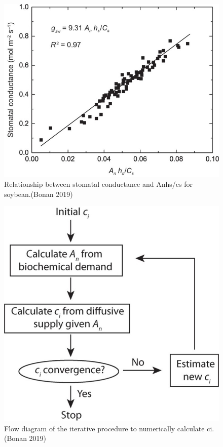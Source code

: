 \documentclass[
  oneside]{book}
\begin{document}
\begin{figure}

{\centering \includegraphics[width=0.8\linewidth]{figures/chap2/ball_berry} 

}

\caption{Relationship between stomatal conductance and Anhs/cs for soybean.(Bonan 2019)}\label{fig:f213}
\end{figure}

\begin{figure}

{\centering \includegraphics[width=0.8\linewidth]{figures/chap2/numerical_solution} 

}

\caption{Flow diagram of the iterative procedure to numerically calculate ci.(Bonan 2019)}\label{fig:f214}
\end{figure}
\end{document}
